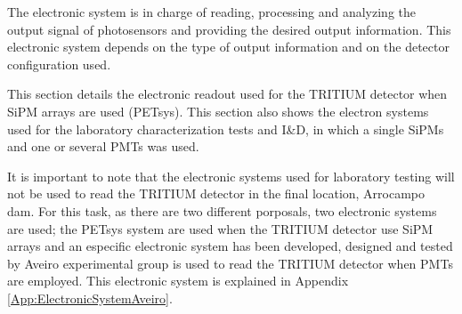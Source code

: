 The electronic system is in charge of reading, processing and analyzing the output signal of photosensors and providing the desired output information. This electronic system depends on the type of output information and on the detector configuration used.

This section details the electronic readout used for the TRITIUM detector when SiPM arrays are used (PETsys). This section also shows the electron systems used for the laboratory characterization tests and I\&D, in which a single SiPMs and one or several PMTs was used.

It is important to note that the electronic systems used for laboratory testing will not be used to read the TRITIUM detector in the final location, Arrocampo dam. For this task, as there are two different porposals, two electronic systems are used; the PETsys system are used when the TRITIUM detector use SiPM arrays and an especific electronic system has been developed, designed and tested by Aveiro experimental group is used to read the TRITIUM detector when PMTs are employed. This electronic system is explained in Appendix \ref{App:ElectronicSystemAveiro}.


 